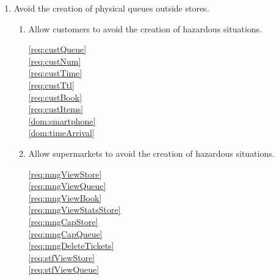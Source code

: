     \begin{enumerate}[label=\textbf{G.\arabic*}]
        \item Avoid the creation of physical queues outside stores.

        \begin{enumerate}[label*=\textbf{.\arabic*}, leftmargin=+.5in]
            \item Allow customers to avoid the creation of hazardous situations.

            \ref{req:custQueue}  ~\\
            \ref{req:custNum}  ~\\
            \ref{req:custTime}  ~\\
            \ref{req:custTtl}  ~\\
            \ref{req:custBook}  ~\\
            \ref{req:custItems}  ~\\

            \ref{dom:smartphone}  ~\\
            \ref{dom:timeArrival}  ~\\


            \item Allow supermarkets to avoid the creation of hazardous situations.

            \ref{req:mngViewStore}  ~\\
            \ref{req:mngViewQueue}  ~\\
            \ref{req:mngViewBook}  ~\\
            \ref{req:mngViewStatsStore}  ~\\
            \ref{req:mngCapStore}  ~\\
            \ref{req:mngCapQueue}  ~\\
            \ref{req:mngDeleteTickets}  ~\\
            \ref{req:stfViewStore}  ~\\
            \ref{req:stfViewQueue}  ~\\



\end{enumerate}
\end{enumerate}
